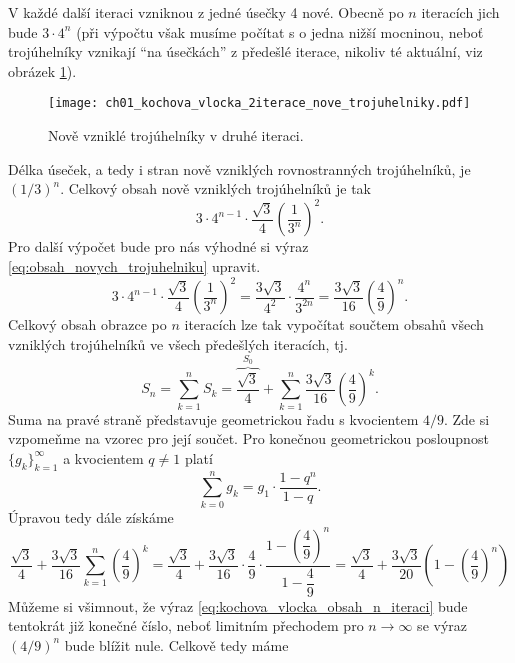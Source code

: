 V každé další iteraci vzniknou z jedné úsečky 4 nové. Obecně po $n$ iteracích jich bude $3\cdot 4^n$ (při výpočtu však musíme počítat s o jedna nižší mocninou, neboť trojúhelníky vznikají ``na úsečkách'' z předešlé iterace, nikoliv té aktuální, viz obrázek \ref{fig:kochova_vlocka_2iterace_nove_trojuhelniky}).
\begin{figure}[h]
    \centering
    \texttt{[image: ch01\_kochova\_vlocka\_2iterace\_nove\_trojuhelniky.pdf]}
    \caption{Nově vzniklé trojúhelníky v druhé iteraci.}
    \label{fig:kochova_vlocka_2iterace_nove_trojuhelniky}
\end{figure}
Délka úseček, a tedy i stran nově vzniklých rovnostranných trojúhelníků, je $(1/3)^n$. Celkový obsah nově vzniklých trojúhelníků je tak
\begin{equation}\label{eq:obsah_novych_trojuhelniku}
    3\cdot 4^{n-1}\cdot\dfrac{\sqrt{3}}{4}\left(\dfrac{1}{3^n}\right)^2.
\end{equation}
Pro další výpočet bude pro nás výhodné si výraz \eqref{eq:obsah_novych_trojuhelniku} upravit.
\begin{equation*}
    3\cdot 4^{n-1}\cdot\dfrac{\sqrt{3}}{4}\left(\dfrac{1}{3^n}\right)^2=\dfrac{3\sqrt{3}}{4^2}\cdot \dfrac{4^n}{3^{2n}}=\dfrac{3\sqrt{3}}{16}\left(\dfrac{4}{9}\right)^n.
\end{equation*}
Celkový obsah obrazce po $n$ iteracích lze tak vypočítat součtem obsahů všech vzniklých trojúhelníků ve všech předešlých iteracích, tj.
\begin{equation*}
    S_n=\sum_{k=1}^n{S_k}=\overbrace{\dfrac{\sqrt{3}}{4}}^{S_0}+\sum_{k=1}^n{\dfrac{3\sqrt{3}}{16}\left(\dfrac{4}{9}\right)^k}.
\end{equation*}
Suma na pravé straně představuje geometrickou řadu s kvocientem $4/9$. Zde si vzpomeňme na vzorec pro její součet. Pro konečnou geometrickou posloupnost $\{g_k\}_{k=1}^\infty$ a kvocientem $q\neq 1$ platí
\begin{equation*}
    \sum_{k=0}^{n}{g_k}=g_1\cdot\dfrac{1-q^n}{1-q}.
\end{equation*}
Úpravou tedy dále získáme
\begin{equation}\label{eq:kochova_vlocka_obsah_n_iteraci}
    \dfrac{\sqrt{3}}{4}+\dfrac{3\sqrt{3}}{16}\sum_{k=1}^n{\left(\dfrac{4}{9}\right)^k}=\dfrac{\sqrt{3}}{4}+\dfrac{3\sqrt{3}}{16}\cdot\dfrac{4}{9}\cdot\dfrac{1-\left(\dfrac{4}{9}\right)^n}{1-\dfrac{4}{9}}=\dfrac{\sqrt{3}}{4}+\dfrac{3\sqrt{3}}{20}\left(1-\left(\dfrac{4}{9}\right)^n\right)
\end{equation}
Můžeme si všimnout, že výraz \eqref{eq:kochova_vlocka_obsah_n_iteraci} bude tentokrát již konečné číslo, neboť limitním přechodem pro $n\to\infty$ se výraz $(4/9)^n$ bude blížit nule. Celkově tedy máme
